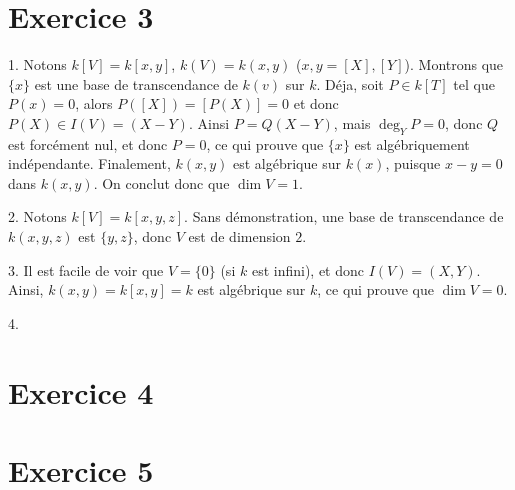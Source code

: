     \section{Exercice 3}
        \begin{question}{1.}
            Notons $k[V] = k[x,y]$, $k(V) = k(x,y)$ ($x,y = [X],[Y]$). Montrons que $\{x\}$ est une base de transcendance de $k(v)$ sur $k$. Déja, soit $P \in k[T]$ tel que $P(x) = 0$, alors $P([X]) = [P(X)] = 0$ et donc $P(X) \in I(V) = (X - Y)$. Ainsi $P = Q(X - Y)$, mais $\deg_Y P = 0$, donc $Q$ est forcément nul, et donc $P = 0$, ce qui prouve que $\{x\}$ est algébriquement indépendante. Finalement, $k(x,y)$ est algébrique sur $k(x)$, puisque $x - y = 0$ dans $k(x,y)$. On conclut donc que $\dim V = 1$.
        \end{question}
        \begin{question}{2.}
            Notons $k[V] = k[x,y,z]$. Sans démonstration, une base de transcendance de $k(x,y,z)$ est $\{y,z\}$, donc $V$ est de dimension $2$.
        \end{question}
        \begin{question}{3.}
            Il est facile de voir que $V = \{0\}$ (si $k$ est infini), et donc $I(V) = (X,Y)$. Ainsi, $k(x,y) = k[x,y] = k$ est algébrique sur $k$, ce qui prouve que $\dim V = 0$.
        \end{question}
        \begin{question}{4.}
        \end{question}

    \section{Exercice 4}

    \section{Exercice 5}

